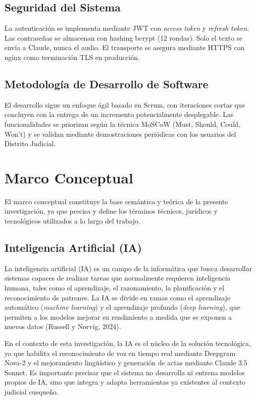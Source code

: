 \documentclass[12pt,a4paper,oneside]{report}
\begin{document}
\subsection{Seguridad del Sistema}

La autenticación se implementa mediante JWT con \textit{access token} y \textit{refresh token}. Las contraseñas se almacenan con hashing bcrypt (12 rondas). Solo el texto se envía a Claude, nunca el audio. El transporte se asegura mediante HTTPS con nginx como terminación TLS en producción.

\subsection{Metodología de Desarrollo de Software}

El desarrollo sigue un enfoque ágil basado en Scrum, con iteraciones cortas que concluyen con la entrega de un incremento potencialmente desplegable. Las funcionalidades se priorizan según la técnica MoSCoW (Must, Should, Could, Won't) y se validan mediante demostraciones periódicas con los usuarios del Distrito Judicial.

\section{Marco Conceptual}

El marco conceptual constituye la base semántica y teórica de la presente investigación, ya que precisa y define los términos técnicos, jurídicos y tecnológicos utilizados a lo largo del trabajo.

\subsection{Inteligencia Artificial (IA)}

La inteligencia artificial (IA) es un campo de la informática que busca desarrollar sistemas capaces de realizar tareas que normalmente requieren inteligencia humana, tales como el aprendizaje, el razonamiento, la planificación y el reconocimiento de patrones. La IA se divide en ramas como el aprendizaje automático (\textit{machine learning}) y el aprendizaje profundo (\textit{deep learning}), que permiten a los modelos mejorar su rendimiento a medida que se exponen a nuevos datos (Russell y Norvig, 2024).

En el contexto de esta investigación, la IA es el núcleo de la solución tecnológica, ya que habilita el reconocimiento de voz en tiempo real mediante Deepgram Nova-2 y el mejoramiento lingüístico y generación de actas mediante Claude 3.5 Sonnet. Es importante precisar que el sistema no desarrolla ni entrena modelos propios de IA, sino que integra y adapta herramientas ya existentes al contexto judicial cusqueño.
\end{document}
